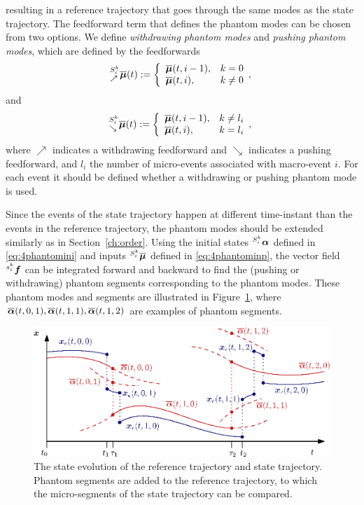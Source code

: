 \documentclass[../DC2017114Bouma.tex]{subfiles}
\begin{document}
resulting in a reference trajectory that goes through the same modes as the state trajectory. The feedforward term that defines the phantom modes can be chosen from two options. We define \textit{withdrawing phantom modes} and \textit{pushing phantom modes}, which are defined by the feedforwards
\begin{equation}
\hspace{0cm}^{S^k_i}_{\nearrow}\overline{\boldsymbol{\mu}}(t) := \left\lbrace\begin{array}{ll}
\overline{\boldsymbol{\mu}}(t,i-1), & k = 0\\
\overline{\boldsymbol{\mu}}(t,i), & k \neq 0
\end{array},\right.
\end{equation}
and
\begin{equation}
\hspace{0cm}^{S^k_i}_{\searrow}\overline{\boldsymbol{\mu}}(t) := \left\lbrace\begin{array}{ll}
\overline{\boldsymbol{\mu}}(t,i-1), & k \neq l_i\\
\overline{\boldsymbol{\mu}}(t,i), & k = l_i
\end{array},\right.\label{eq:4phantominp}
\end{equation}
%
where $\nearrow$ indicates a withdrawing feedforward and $\searrow$ indicates a pushing feedforward, and $l_i$ the number of micro-events associated with macro-event $i$. For each event it should be defined whether a withdrawing or pushing phantom mode is used. 

Since the events of the state trajectory happen at different time-instant than the events in the reference trajectory, the phantom modes should be extended similarly as in Section~\ref{ch:order}. 
Using the initial states $\hspace{0cm}^{S_i^{k}}\boldsymbol{\alpha}$ defined in \eqref{eq:4phantomini} and inputs $\hspace{0cm}^{S^k_i}\overline{\boldsymbol{\mu}}$ defined in \eqref{eq:4phantominp}, the vector field $\hspace{0cm}^{s^k_i}{\boldsymbol{f}}$ can be integrated forward and backward to find the (pushing or withdrawing) phantom segments corresponding to the phantom modes. These phantom modes and segments are illustrated in Figure~\ref{fig:4simulmicro}, where $\overline{\boldsymbol{\alpha}}(t,0,1),\overline{\boldsymbol{\alpha}}(t,1,1),\overline{\boldsymbol{\alpha}}(t,1,2)$ are examples of phantom segments.
\begin{figure}[h]
\centering
\includegraphics[width=\textwidth]{simulmicro.eps}\caption{The state evolution of the reference trajectory and state trajectory. Phantom segments are added to the reference trajectory, to which the micro-segments of the state trajectory can be compared.}\label{fig:4simulmicro}
\end{figure}
\end{document}
